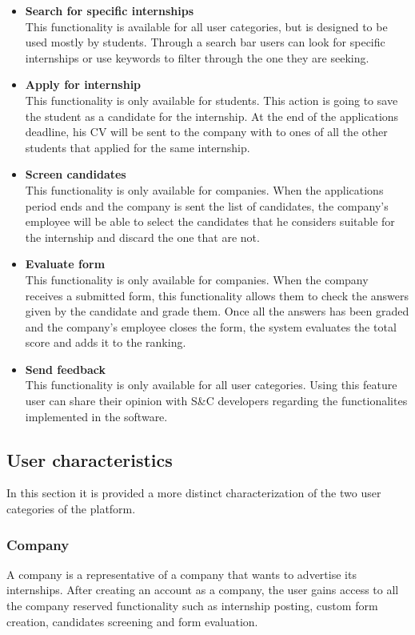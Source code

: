 \documentclass[11pt,twoside]{article}
\begin{document}
\begin{itemize}
\item \textbf{Search for specific internships} \\
This functionality is available for all user categories, but is designed to be used mostly by students. Through a search bar users can look for specific internships or use keywords to filter through the one they are seeking.
\item \textbf{Apply for internship} \\
This functionality is only available for students. This action is going to save the student as a candidate for the internship. At the end of the applications deadline, his CV will be sent to the company with to ones of all the other students that applied for the same internship.
\item \textbf{Screen candidates} \\
This functionality is only available for companies. When the applications period ends and the company is sent the list of candidates, the company's employee will be able to select the candidates that he considers suitable for the internship and discard the one that are not.
\item \textbf{Evaluate form} \\
This functionality is only available for companies. When the company receives a submitted form, this functionality allows them to check the answers given by the candidate and grade them. Once all the answers has been graded and the company's employee closes the form, the system evaluates the total score and adds it to the ranking.
\item \textbf{Send feedback} \\
This functionality is only available for all user categories. Using this feature user can share their opinion with S\&C developers regarding the functionalites implemented in the software.
\end{itemize}

	\subsection{User characteristics}
In this section it is provided a more distinct characterization of the two user categories of the platform.
		\subsubsection{Company}
A company is a representative of a company that wants to advertise its internships. After creating an account as a company, the user gains access to all the company reserved functionality such as internship posting, custom form creation, candidates screening and form evaluation.
\end{document}
